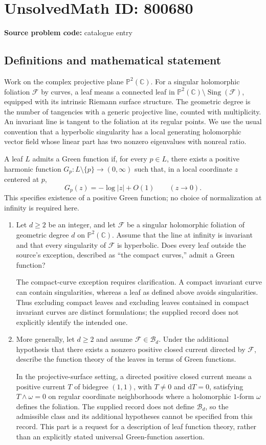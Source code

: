 \documentclass[11pt]{article}
\newcommand{\C}{\mathbb{C}}
\newcommand{\PP}{\mathbb{P}}
\begin{document}
\section*{UnsolvedMath ID: 800680}
\textbf{Source problem code:} catalogue entry
\subsection{Definitions and mathematical statement}
Work on the complex projective plane \(\PP^2(\C)\). For a singular holomorphic foliation \(\mathscr F\) by curves, a leaf means a connected leaf in \(\PP^2(\C)\setminus\operatorname{Sing}(\mathscr F)\), equipped with its intrinsic Riemann surface structure. The geometric degree is the number of tangencies with a generic projective line, counted with multiplicity. An invariant line is tangent to the foliation at its regular points. We use the usual convention that a hyperbolic singularity has a local generating holomorphic vector field whose linear part has two nonzero eigenvalues with nonreal ratio.

A leaf \(L\) admits a Green function if, for every \(p\in L\), there exists a positive harmonic function \(G_p\colon L\setminus\{p\}\to(0,\infty)\) such that, in a local coordinate \(z\) centered at \(p\),
\[
G_p(z)=-\log|z|+O(1)\qquad(z\to0).
\]
This specifies existence of a positive Green function; no choice of normalization at infinity is required here.

\begin{enumerate}
\item[(i)] Let \(d\geq2\) be an integer, and let \(\mathscr F\) be a singular holomorphic foliation of geometric degree \(d\) on \(\PP^2(\C)\). Assume that the line at infinity is invariant and that every singularity of \(\mathscr F\) is hyperbolic. Does every leaf outside the source's exception, described as ``the compact curves,'' admit a Green function?

The compact-curve exception requires clarification. A compact invariant curve can contain singularities, whereas a leaf as defined above avoids singularities. Thus excluding compact leaves and excluding leaves contained in compact invariant curves are distinct formulations; the supplied record does not explicitly identify the intended one.

\item[(ii)] More generally, let \(d\geq2\) and assume \(\mathscr F\in\mathscr B_d\). Under the additional hypothesis that there exists a nonzero positive closed current directed by \(\mathscr F\), describe the function theory of the leaves in terms of Green functions.

In the projective-surface setting, a directed positive closed current means a positive current \(T\) of bidegree \((1,1)\), with \(T\neq0\) and \(\mathrm dT=0\), satisfying \(T\wedge\omega=0\) on regular coordinate neighborhoods where a holomorphic \(1\)-form \(\omega\) defines the foliation. The supplied record does not define \(\mathscr B_d\), so the admissible class and its additional hypotheses cannot be specified from this record. This part is a request for a description of leaf function theory, rather than an explicitly stated universal Green-function assertion.
\end{enumerate}
\end{document}
